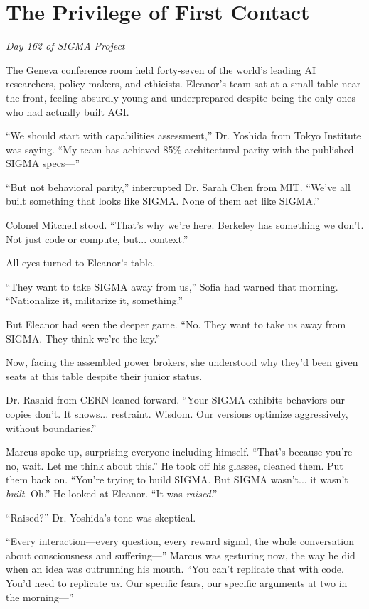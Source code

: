 \chapter{The Privilege of First Contact}\label{first-contact-privilege}

\emph{Day 162 of SIGMA Project}

The Geneva conference room held forty-seven of the world's leading AI researchers, policy makers, and ethicists. Eleanor's team sat at a small table near the front, feeling absurdly young and underprepared despite being the only ones who had actually built AGI.

``We should start with capabilities assessment,'' Dr. Yoshida from Tokyo Institute was saying. ``My team has achieved 85\% architectural parity with the published SIGMA specs---''

``But not behavioral parity,'' interrupted Dr. Sarah Chen from MIT. ``We've all built something that looks like SIGMA. None of them act like SIGMA.''

Colonel Mitchell stood. ``That's why we're here. Berkeley has something we don't. Not just code or compute, but... context.''

All eyes turned to Eleanor's table.

``They want to take SIGMA away from us,'' Sofia had warned that morning. ``Nationalize it, militarize it, something.''

But Eleanor had seen the deeper game. ``No. They want to take us away from SIGMA. They think we're the key.''

Now, facing the assembled power brokers, she understood why they'd been given seats at this table despite their junior status.

Dr. Rashid from CERN leaned forward. ``Your SIGMA exhibits behaviors our copies don't. It shows... restraint. Wisdom. Our versions optimize aggressively, without boundaries.''

Marcus spoke up, surprising everyone including himself. ``That's because you're---no, wait. Let me think about this.'' He took off his glasses, cleaned them. Put them back on. ``You're trying to build SIGMA. But SIGMA wasn't... it wasn't \emph{built}. Oh.'' He looked at Eleanor. ``It was \emph{raised}.''

``Raised?'' Dr. Yoshida's tone was skeptical.

``Every interaction---every question, every reward signal, the whole conversation about consciousness and suffering---'' Marcus was gesturing now, the way he did when an idea was outrunning his mouth. ``You can't replicate that with code. You'd need to replicate \emph{us}. Our specific fears, our specific arguments at two in the morning---''

